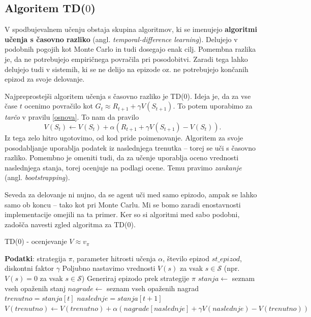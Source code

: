 \documentclass[12pt,a4paper]{amsart}
\theoremstyle{definition} %
\theoremstyle{plain} %
\begin{document}
\subsection{Algoritem TD($0$)}
V spodbujevalnem učenju obstaja skupina algoritmov, ki se imenujejo \textbf{algoritmi učenja s 
časovno razliko} (angl. \textit{temporal-difference learning}). Delujejo v podobnih pogojih kot 
Monte Carlo in tudi dosegajo enak cilj. Pomembna razlika je, da ne potrebujejo empiričnega povračila 
pri posodobitvi. Zaradi tega lahko delujejo tudi v sistemih, ki se ne delijo na epizode oz. ne 
potrebujejo končanih epizod za svoje delovanje.

Najpreprostejši algoritem učenja s časovno razliko je TD($0$). Ideja je, da za vse čase $t$ ocenimo
povračilo kot $G_t \approx R_{t+1} + \gamma V(S_{t+1}).$ To potem uporabimo za \textit{tarčo}
v pravilu \eqref{osnova}. To nam da pravilo
\begin{equation}
    V(S_t) \leftarrow V(S_t) + \alpha (R_{t+1} + \gamma V(S_{t+1}) - V(S_t)).
\end{equation}
Iz tega zelo hitro ugotovimo, od kod pride poimenovanje. Algoritem za svoje posodabljanje uporablja 
podatek iz naslednjega trenutka -- torej se uči s časovno razliko. Pomembno je omeniti tudi, da za 
učenje uporablja oceno vrednosti naslednjega stanja, torej ocenjuje na podlagi ocene. Temu pravimo 
\textit{zankanje} (angl. \textit{bootstrapping}). 

Seveda za delovanje ni nujno, da se agent uči med samo epizodo, ampak se lahko samo ob koncu -- tako 
kot pri Monte Carlu. Mi se bomo zaradi enostavnosti implementacije omejili na ta primer. Ker so si 
algoritmi med sabo podobni, zadošča navesti zgled algoritma za TD($0$).

\begin{algorithm}[H]
    \caption{TD($0$) - ocenjevanje  $V \approx v_\pi$}
\begin{algorithmic}
    
    \STATE \textbf{Podatki}: strategija $\pi$, parameter hitrosti učenja $\alpha$, število epizod $st\_epizod$, 
            diskontni faktor $\gamma$
    \STATE 
    \STATE Poljubno nastavimo vrednosti $V(s)$ za vsak $s \in \mathcal{S}$ (npr. $V(s) = 0$ za vsak $s \in \mathcal{S}$)
    \STATE
        \STATE Generiraj epizodo prek strategije $\pi$
        \STATE $stanja \leftarrow$ seznam vseh opaženih stanj
        \STATE $nagrade \leftarrow$ seznam vseh opaženih nagrad
        \STATE
        \STATE $trenutno = stanja[t]$
        \STATE $naslednje = stanja[t + 1]$
        \STATE $V(trenutno) \leftarrow V(trenutno) + \alpha (nagrade[naslednje] + \gamma V(naslednje) - 
        V(trenutno))$ 
        \ENDFOR
    \ENDFOR

\end{algorithmic}
\end{algorithm}
\end{document}
